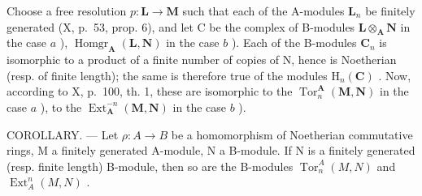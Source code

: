 Choose a free resolution \(p: \mathbf{L} \to \mathbf{M}\) such that each of the A-modules \(\mathbf{L}_n\) be finitely generated (X, p.~53, prop. 6), and let C be the complex of B-modules \(\mathbf{L} \otimes_{\mathbf{A}} \mathbf{N}\) in the case \(a\) ), \(\operatorname{Homgr}_{\mathbf{A}}(\mathbf{L}, \mathbf{N})\) in the case \(b\) ). Each of the B-modules \(\mathbf{C}_n\) is isomorphic to a product of a finite number of copies of N, hence is Noetherian (resp. of finite length); the same is therefore true of the modules \(\mathrm{H}_n(\mathbf{C})\) . Now, according to X, p.~100, th. 1, these are isomorphic to the \(\operatorname{Tor}_n^{\mathbf{A}}(\mathbf{M}, \mathbf{N})\) in the case \(a\) ), to the \(\operatorname{Ext}_{\mathbf{A}}^{-n}(\mathbf{M}, \mathbf{N})\) in the case \(b\) ).

COROLLARY. --- Let \(\rho: A \to B\) be a homomorphism of Noetherian commutative rings, M a finitely generated A-module, N a B-module. If N is a finitely generated (resp. finite length) B-module, then so are the B-modules \(\operatorname{Tor}_{n}^{A}(M, N)\) and \(\operatorname{Ext}_{A}^{n}(M, N)\) .

